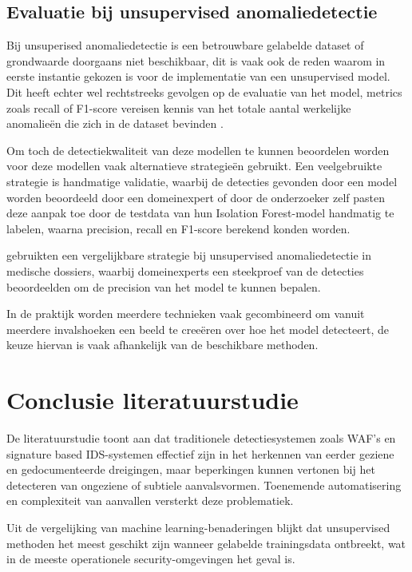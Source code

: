 \subsection{Evaluatie bij unsupervised anomaliedetectie}
\label{subsec:toegevoegde-waarde-ML}
Bij unsuperised anomaliedetectie is een betrouwbare gelabelde dataset of grondwaarde doorgaans niet beschikbaar, dit is vaak ook de reden waarom in eerste instantie gekozen is voor de implementatie van een unsupervised model. Dit heeft echter wel rechtstreeks gevolgen op de evaluatie van het model, metrics zoals recall of F1-score vereisen kennis van het totale aantal werkelijke anomalieën die zich in de dataset bevinden \autocite{Goldstein2016}.

Om toch de detectiekwaliteit van deze modellen te kunnen beoordelen worden voor deze modellen vaak alternatieve strategieën gebruikt. Een veelgebruikte strategie is handmatige validatie, waarbij de detecties gevonden door een model worden beoordeeld door een domeinexpert of door de onderzoeker zelf \textcite{Chua2024} pasten deze aanpak toe door de testdata van hun Isolation Forest-model handmatig te labelen, waarna precision, recall en F1-score berekend konden worden.

\textcite{Rochner2023} gebruikten een vergelijkbare strategie bij unsupervised anomaliedetectie in medische dossiers, waarbij domeinexperts een steekproef van de detecties beoordeelden om de precision van het model te kunnen bepalen. 

In de praktijk worden meerdere technieken vaak gecombineerd om vanuit meerdere invalshoeken een beeld te creeëren over hoe het model detecteert, de keuze hiervan is vaak afhankelijk van de beschikbare methoden. 

\section{Conclusie literatuurstudie}
\label{sec:ML-methoden-anomalie}

De literatuurstudie toont aan dat traditionele detectiesystemen zoals WAF's en signature based IDS-systemen effectief zijn in het herkennen van eerder geziene en gedocumenteerde dreigingen, maar beperkingen kunnen vertonen bij het detecteren van ongeziene of subtiele aanvalsvormen. Toenemende automatisering en complexiteit van aanvallen versterkt deze problematiek. 

Uit de vergelijking van machine learning-benaderingen blijkt dat unsupervised methoden het meest geschikt zijn wanneer gelabelde trainingsdata ontbreekt, wat in de meeste operationele security-omgevingen het geval is. 

